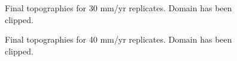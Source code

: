 \begin{figure}[!ht]
	\caption{Final topographies for 30 mm/yr replicates. Domain has been clipped.}
	\label{fig:030topo}
\end{figure}

\begin{figure}[!ht]
	\caption{Final topographies for 40 mm/yr replicates. Domain has been clipped.}
	\label{fig:040topo}
\end{figure}